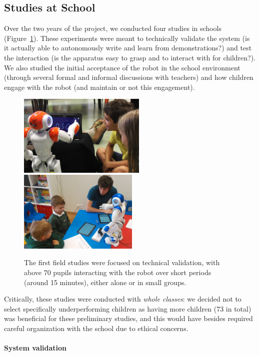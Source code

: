 \documentclass{article}
\begin{document}
\subsection{Studies at School}

Over the two years of the project, we conducted four studies in schools
(Figure~\ref{fig:schools}). These experiments were meant to technically validate
the system (is it actually able to autonomously write and learn from
demonstrations?) and test the interaction (is the apparatus easy to grasp and to
interact with for children?). We also studied the initial acceptance of the
robot in the school environment (through several formal and informal discussions
with teachers) and how children engage with the robot (and maintain or not this
engagement).

\begin{figure}
    \centering
    \includegraphics[height=3.9cm]{schools}
    \includegraphics[height=3.9cm]{schools2}
    \caption{\small The first field studies were focused on technical validation, with
    above 70 pupils interacting with the robot over short periods (around 15
minutes), either alone or in small groups.}
    \label{fig:schools}
\end{figure}

Critically, these studies were conducted with \emph{whole classes}: we decided
not to select specifically underperforming children as having more children (73
in total) was beneficial for these preliminary studies, and this would have
besides required careful organization with the school due to ethical concerns.

\paragraph{System validation}
\end{document}
